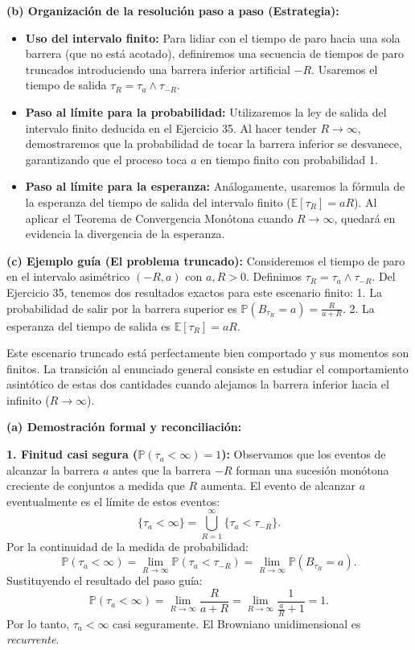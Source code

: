 \documentclass[11pt, letterpaper]{article}
\begin{document}
\begin{solucion}
    \textbf{(b) Organización de la resolución paso a paso (Estrategia):}
    \begin{itemize}
        \item[(i)] \textbf{Uso del intervalo finito:} Para lidiar con el tiempo de paro hacia una sola barrera (que no está acotado), definiremos una secuencia de tiempos de paro truncados introduciendo una barrera inferior artificial $-R$. Usaremos el tiempo de salida $\tau_R = \tau_a \wedge \tau_{-R}$.
        \item[(ii)] \textbf{Paso al límite para la probabilidad:} Utilizaremos la ley de salida del intervalo finito deducida en el Ejercicio 35. Al hacer tender $R \to \infty$, demostraremos que la probabilidad de tocar la barrera inferior se desvanece, garantizando que el proceso toca $a$ en tiempo finito con probabilidad 1.
        \item[(iii)] \textbf{Paso al límite para la esperanza:} Análogamente, usaremos la fórmula de la esperanza del tiempo de salida del intervalo finito ($\mathbb{E}[\tau_R] = aR$). Al aplicar el Teorema de Convergencia Monótona cuando $R \to \infty$, quedará en evidencia la divergencia de la esperanza.
    \end{itemize}

    \vspace{3mm}
    \textbf{(c) Ejemplo guía (El problema truncado):}
    Consideremos el tiempo de paro en el intervalo asimétrico $(-R, a)$ con $a, R > 0$.
    Definimos $\tau_R = \tau_a \wedge \tau_{-R}$. 
    Del Ejercicio 35, tenemos dos resultados exactos para este escenario finito:
    1. La probabilidad de salir por la barrera superior es $\mathbb{P}(B_{\tau_R} = a) = \frac{R}{a+R}$.
    2. La esperanza del tiempo de salida es $\mathbb{E}[\tau_R] = aR$.
    
    Este escenario truncado está perfectamente bien comportado y sus momentos son finitos. La transición al enunciado general consiste en estudiar el comportamiento asintótico de estas dos cantidades cuando alejamos la barrera inferior hacia el infinito ($R \to \infty$).

    \vspace{3mm}
    \textbf{(a) Demostración formal y reconciliación:}

    \textbf{1. Finitud casi segura ($\mathbb{P}(\tau_a < \infty) = 1$):}
    Observamos que los eventos de alcanzar la barrera $a$ antes que la barrera $-R$ forman una sucesión monótona creciente de conjuntos a medida que $R$ aumenta. 
    El evento de alcanzar $a$ eventualmente es el límite de estos eventos:
    \[ \{\tau_a < \infty\} = \bigcup_{R=1}^\infty \{ \tau_a < \tau_{-R} \}. \]
    Por la continuidad de la medida de probabilidad:
    \[ \mathbb{P}(\tau_a < \infty) = \lim_{R \to \infty} \mathbb{P}(\tau_a < \tau_{-R}) = \lim_{R \to \infty} \mathbb{P}(B_{\tau_R} = a). \]
    Sustituyendo el resultado del paso guía:
    \[ \mathbb{P}(\tau_a < \infty) = \lim_{R \to \infty} \frac{R}{a+R} = \lim_{R \to \infty} \frac{1}{\frac{a}{R} + 1} = 1. \]
    Por lo tanto, $\tau_a < \infty$ casi seguramente. El Browniano unidimensional es \textit{recurrente}.


\end{solucion}
\end{document}
